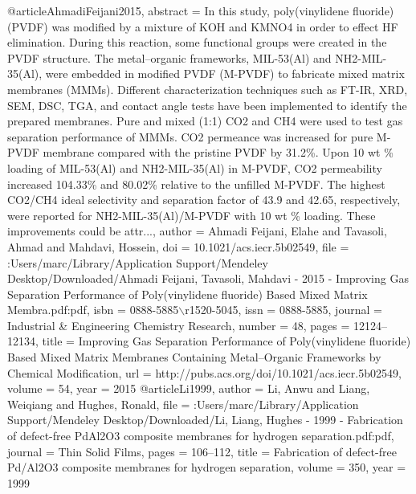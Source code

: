@article{AhmadiFeijani2015,
abstract = {In this study, poly(vinylidene fluoride) (PVDF) was modified by a mixture of KOH and KMNO4 in order to effect HF elimination. During this reaction, some functional groups were created in the PVDF structure. The metal–organic frameworks, MIL-53(Al) and NH2-MIL-35(Al), were embedded in modified PVDF (M-PVDF) to fabricate mixed matrix membranes (MMMs). Different characterization techniques such as FT-IR, XRD, SEM, DSC, TGA, and contact angle tests have been implemented to identify the prepared membranes. Pure and mixed (1:1) CO2 and CH4 were used to test gas separation performance of MMMs. CO2 permeance was increased for pure M-PVDF membrane compared with the pristine PVDF by 31.2{\%}. Upon 10 wt {\%} loading of MIL-53(Al) and NH2-MIL-35(Al) in M-PVDF, CO2 permeability increased 104.33{\%} and 80.02{\%} relative to the unfilled M-PVDF. The highest CO2/CH4 ideal selectivity and separation factor of 43.9 and 42.65, respectively, were reported for NH2-MIL-35(Al)/M-PVDF with 10 wt {\%} loading. These improvements could be attr...},
author = {{Ahmadi Feijani}, Elahe and Tavasoli, Ahmad and Mahdavi, Hossein},
doi = {10.1021/acs.iecr.5b02549},
file = {:Users/marc/Library/Application Support/Mendeley Desktop/Downloaded/Ahmadi Feijani, Tavasoli, Mahdavi - 2015 - Improving Gas Separation Performance of Poly(vinylidene fluoride) Based Mixed Matrix Membra.pdf:pdf},
isbn = {0888-5885$\backslash$r1520-5045},
issn = {0888-5885},
journal = {Industrial {\&} Engineering Chemistry Research},
number = {48},
pages = {12124--12134},
title = {{Improving Gas Separation Performance of Poly(vinylidene fluoride) Based Mixed Matrix Membranes Containing Metal–Organic Frameworks by Chemical Modification}},
url = {http://pubs.acs.org/doi/10.1021/acs.iecr.5b02549},
volume = {54},
year = {2015}
}
@article{Li1999,
author = {Li, Anwu and Liang, Weiqiang and Hughes, Ronald},
file = {:Users/marc/Library/Application Support/Mendeley Desktop/Downloaded/Li, Liang, Hughes - 1999 - Fabrication of defect-free PdAl2O3 composite membranes for hydrogen separation.pdf:pdf},
journal = {Thin Solid Films},
pages = {106--112},
title = {{Fabrication of defect-free Pd/Al2O3 composite membranes for hydrogen separation}},
volume = {350},
year = {1999}
}
